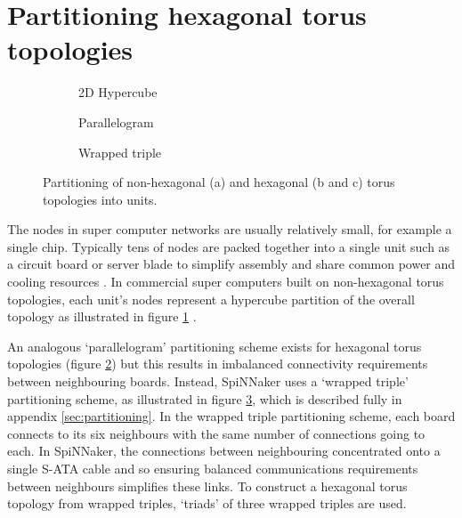 	\section{Partitioning hexagonal torus topologies}
		
		\begin{figure}
			\center
			\begin{subfigure}[b]{0.32\textwidth}
				\center
				\caption{2D Hypercube}
				\label{fig:hypercube-partitioning}
			\end{subfigure}
			\begin{subfigure}[b]{0.32\textwidth}
				\center
				\caption{Parallelogram}
				\label{fig:parallelogram-partitioning}
			\end{subfigure}
			\begin{subfigure}[b]{0.32\textwidth}
				\center
				\caption{Wrapped triple}
				\label{fig:wrapped-triple-partitioning}
			\end{subfigure}
			
			\caption{Partitioning of non-hexagonal (a) and hexagonal (b and c) torus
			topologies into units.}
			\label{fig:partitioning-options}
		\end{figure}
		
		The nodes in super computer networks are usually relatively small, for
		example a single chip. Typically tens of nodes are packed together into a
		single unit such as a circuit board or server blade to simplify assembly
		and share common power and cooling resources \cite{gilge14,ajima12}. In
		commercial super computers built on non-hexagonal torus topologies, each
		unit's nodes represent a hypercube partition of the overall topology as
		illustrated in figure \ref{fig:hypercube-partitioning}
		\cite{chen11,ajima12}.
		
		An analogous `parallelogram' partitioning scheme exists for hexagonal torus
		topologies (figure \ref{fig:parallelogram-partitioning}) but this results
		in imbalanced connectivity requirements between neighbouring boards.
		Instead, SpiNNaker uses a `wrapped triple' partitioning scheme, as
		illustrated in figure \ref{fig:wrapped-triple-partitioning}, which is
		described fully in appendix \ref{sec:partitioning}. In the wrapped triple
		partitioning scheme, each board connects to its six neighbours with the
		same number of connections going to each. In SpiNNaker, the connections
		between neighbouring concentrated onto a single S-ATA cable and so ensuring
		balanced communications requirements between neighbours simplifies these
		links. To construct a hexagonal torus topology from wrapped triples,
		`triads' of three wrapped triples are used.
		
